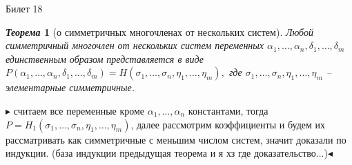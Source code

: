 \documentclass[a4paper,12pt]{article}
\newtheorem{teo}{\textit{Теорема}}
\newcommand{\AL}{\alpha}
\newcommand{\pb}{\blacktriangleright}
\newcommand{\pe}{\blacktriangleleft}
\begin{document}
\begin{mybox2}{\hypertarget{bil18}{Билет 18}}
\begin{formbox}{}
\begin{teo} [о симметричных многочленах от нескольких систем] Любой симметричный многочлен от нескольких систем переменных $\AL_1, \dots, \AL_n, \delta_1,\dots,\delta_m$  единственным образом представляется в виде $P(\AL_1,\dots,\AL_n,\delta_1,\dots,\delta_m) = H(\sigma_1, \dots, \sigma_n, \eta_1,\dots, \eta_m),$ где $\sigma_1, \dots, \sigma_n, \eta_1,\dots, \eta_m$ -- элементарные симметричные.
\end{teo}
\end{formbox}
$\pb $ считаем все переменные кроме $\AL_1,\dots,\AL_n$ константами, тогда $P = H_1(\sigma_1, \dots, \sigma_n, \eta_1,\dots, \eta_m)$, далее рассмотрим коэффициенты и будем их рассматривать как симметричные с меньшим числом систем, значит доказали по индукции. (база индукции предыдущая теорема и я хз где доказательство...)$\pe$ 

\end{mybox2}
\newpage
\end{document}
